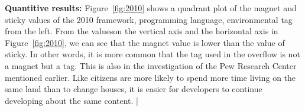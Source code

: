 \documentclass[english,preprint,JIP]{ipsj}
\begin{document}


\textbf{Quantitive results:}
Figure~\ref{fig:2010} shows a quadrant plot of the magnet and sticky values ​​of the 2010 framework, programming language, environmental tag from the left. From the values ​​on the vertical axis and the horizontal axis in Figure~\ref{fig:2010}, we can see that the magnet value is lower than the value of sticky. In other words, it is more common that the tag used in the overflow is not a magnet but a tag. This is also in the investigation of the Pew Research Center mentioned earlier. Like citizens are more likely to spend more time living on the same land than to change houses,  it is easier for developers to continue developing about the same content.
\smallskip
%   
|
\end{document}
